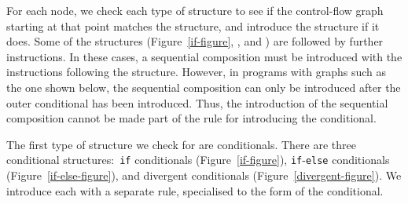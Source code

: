For each node, we check each type of structure to see if the
control-flow graph starting at that point matches the structure, and
introduce the structure if it does.
Some of the structures (Figure~\ref{if-figure},
,  and
) are followed by further instructions.
In these cases, a sequential composition must be introduced with the
instructions following the structure.
However, in programs with graphs such as the one shown below, the
sequential composition can only be introduced after the outer
conditional has been introduced.
Thus, the introduction of the sequential composition cannot be made
part of the rule for introducing the conditional.
\begin{center}
\end{center}

The first type of structure we check for are conditionals.
There are three conditional structures:~\texttt{if} conditionals
(Figure~\ref{if-figure}), \texttt{if}-\texttt{else} conditionals
(Figure~\ref{if-else-figure}), and divergent conditionals
(Figure~\ref{divergent-figure}).
We introduce each with a separate rule, specialised to the form of the
conditional.

